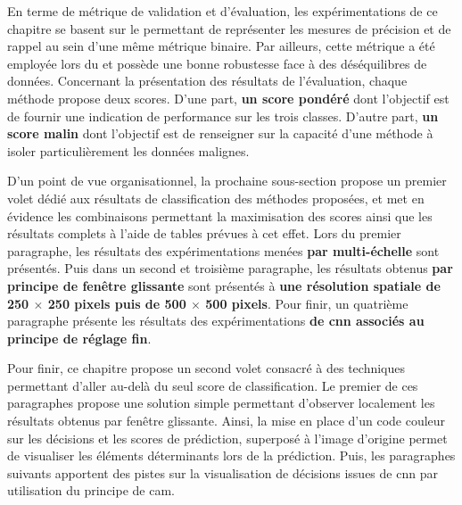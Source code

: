 En terme de métrique de validation et d'évaluation, les expérimentations de ce chapitre se basent sur le \textbf{\fscore{}} permettant de représenter les mesures de précision et de rappel au sein d'une même métrique binaire. Par ailleurs, cette métrique a été employée lors du  et possède une bonne robustesse face à des déséquilibres de données. Concernant la présentation des résultats de l'évaluation, chaque méthode propose deux scores. D'une part, \textbf{un score pondéré} dont l'objectif est de fournir une indication de performance sur les trois classes. D'autre part, \textbf{un score malin} dont l'objectif est de renseigner sur la capacité d'une méthode à isoler particulièrement les données malignes.\par

D'un point de vue organisationnel, la prochaine sous-section propose un premier volet dédié aux résultats de classification des méthodes proposées, et met en évidence les combinaisons permettant la maximisation des scores ainsi que les résultats complets à l'aide de tables prévues à cet effet. Lors du premier paragraphe, les résultats des expérimentations menées \textbf{par multi-échelle} sont présentés. Puis dans un second et troisième paragraphe, les résultats obtenus \textbf{par principe de fenêtre glissante} sont présentés à \textbf{une résolution spatiale de 250 $\times$ 250 pixels puis de 500 $\times$ 500 pixels}. Pour finir, un quatrième paragraphe présente les résultats des expérimentations \textbf{de \gls{cnn} associés au principe de réglage fin}.\par

Pour finir, ce chapitre propose un second volet consacré à des techniques permettant d'aller au-delà du seul score de classification. Le premier de ces paragraphes propose une solution simple permettant d'observer localement les résultats obtenus par fenêtre glissante. Ainsi, la mise en place d'un code couleur sur les décisions et les scores de prédiction, superposé à l'image d'origine permet de visualiser les éléments déterminants lors de la prédiction. Puis, les paragraphes suivants apportent des pistes sur la visualisation de décisions issues de \gls{cnn} par utilisation du principe de \gls{cam}.\par
\clearpage

